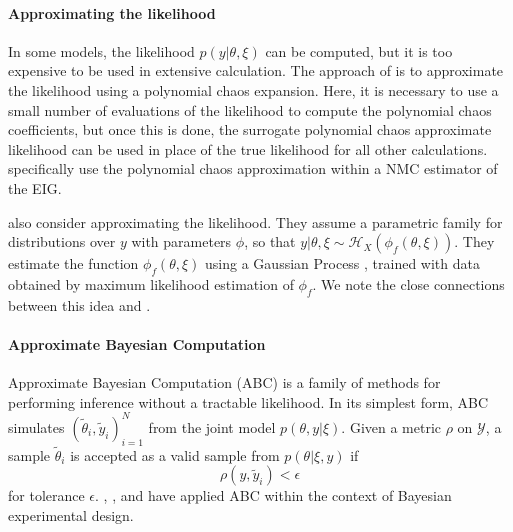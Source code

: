\documentclass[a4paper, 10pt]{report}
\theoremstyle{plain}
\begin{document}
	\paragraph{Approximating the likelihood}
	In some models, the likelihood $p(y|\theta,\xi)$ can be computed, but it is too expensive to be used in extensive calculation.
	The approach of \citet{huan2013simulation} is to approximate the likelihood using a polynomial chaos expansion.
	Here, it is necessary to use a small number of evaluations of the likelihood to compute the polynomial chaos coefficients, but once this is done, the surrogate polynomial chaos approximate likelihood can be used in place of the true likelihood for all other calculations. \citet{huan2013simulation} specifically use the polynomial chaos approximation within a NMC estimator of the EIG.
	
	\citet{overstall2020bayesian} also consider approximating the likelihood. They assume a parametric family for distributions over $y$ with parameters $\phi$, so that $y|\theta,\xi \sim \mathcal{H}_X( \phi_f(\theta,\xi))$. They estimate the function $\phi_f(\theta,\xi)$ using a Gaussian Process \citep{williams2006gaussian}, trained with data obtained by maximum likelihood estimation of $\phi_f$. We note the close connections between this idea and \citet{foster2019variational}.
	
	\paragraph{Approximate Bayesian Computation}
	Approximate Bayesian Computation (ABC) \citep{csillery2010approximate} is a family of methods for performing inference without a tractable likelihood.
	In its simplest form, ABC simulates $(\tilde{\theta}_i,\tilde{y}_i)_{i=1}^N$ from the joint model $p(\theta,y|\xi)$. Given a metric  $\rho$ on $\mathcal{Y}$, a sample $\tilde{\theta}_i$ is accepted as a valid sample from $p(\theta|\xi,y)$ if
	\begin{equation}
	\rho(y,\tilde{y}_i) < \epsilon
	\end{equation} 
	for tolerance $\epsilon$.
	\citet{drovandi2013bayesian}, \citet{hainy2016likelihood}, \citet{price2016efficient} and \citet{dehideniya2018optimal} have applied ABC within the context of Bayesian experimental design.
	
\end{document}
